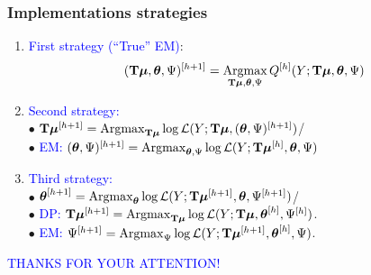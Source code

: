 \documentclass[compress]{beamer}
\newcommand{\argmax}{\operatornamewithlimits{Argmax}}
\newcommand{\mubf}{\text{\mathversion{bold}{$\mu$}}}
\newcommand{\thetabf}{\text{\mathversion{bold}{$\theta$}}}
\newcommand{\Tbf}{\textbf{T}}
\begin{document}
\begin{frame}
\frametitle{Implementations strategies}
\begin{enumerate}
\item<1-> \textcolor{blue}{First strategy (``True'' EM)}: 
\begin{eqnarray*}
(\Tbf\mubf,\thetabf,\Psi)^{[h+1]} =\argmax_{\Tbf\mubf,\thetabf,\Psi}Q^{[h]}(Y;\Tbf\mubf,\thetabf,\Psi)
\end{eqnarray*}
\item <3->\textcolor{blue}{Second strategy:}\\
\vspace{0.3cm}
$\bullet$ $\Tbf\mubf^{[h+1]}=\argmax_{\Tbf\mubf}\log\mathcal{L}(Y;\Tbf\mubf,(\thetabf,\Psi)^{[h+1]})$/\\
\vspace{0.2cm}
$\bullet$ \textcolor{blue}{EM:} $(\thetabf,\Psi)^{[h+1]}=\argmax_{\thetabf,\Psi}\log\mathcal{L}(Y;\Tbf\mubf^{[h]},\thetabf,\Psi)$\\

\item<5-> \textcolor{blue}{Third strategy:}\\
\vspace{0.3cm}
$\bullet$ $\thetabf^{[h+1]}=\argmax_{\thetabf}\log\mathcal{L}(Y;\Tbf\mubf^{[h+1]},\thetabf,\Psi^{[h+1]})$/\\
\vspace{0.2cm}
$\bullet$ \textcolor{blue}{DP:} $\Tbf\mubf^{[h+1]}=\argmax_{\Tbf\mubf}\log\mathcal{L}(Y;\Tbf\mubf,\thetabf^{[h]},\Psi^{[h]})$.\\
\vspace{0.2cm}
$\bullet$ \textcolor{blue}{EM:} $\Psi^{[h+1]}=\argmax_{\Psi}\log\mathcal{L}(Y;\Tbf\mubf^{[h+1]},\thetabf^{[h]},\Psi)$. 
\end{enumerate}
\end{frame}

\begin{frame}
\begin{center}
\textcolor{blue}{THANKS FOR YOUR ATTENTION!}
\end{center}
\end{frame}
\end{document}
